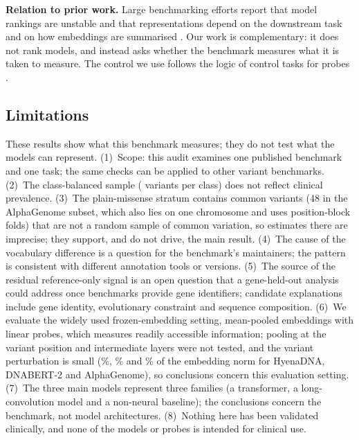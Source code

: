 \documentclass[11pt]{article}
\begin{document}
\textbf{Relation to prior work.} Large benchmarking efforts report that model rankings are unstable and that representations depend on the downstream task and on how embeddings are summarised \citep{feng2025benchmark,tang2025representational,ledneva2026geneb}. Our work is complementary: it does not rank models, and instead asks whether the benchmark measures what it is taken to measure. The control we use follows the logic of control tasks for probes \citep{hewitt2019control}.

\subsection*{Limitations}
These results show what this benchmark measures; they do not test what the models can represent. (1)~Scope: this audit examines one published benchmark and one task; the same checks can be applied to other variant benchmarks. (2)~The class-balanced sample (\NPerClass{} variants per class) does not reflect clinical prevalence. (3)~The plain-missense stratum contains \PureStratC{} common variants (48 in the AlphaGenome subset, which also lies on one chromosome and uses position-block folds) that are not a random sample of common variation, so estimates there are imprecise; they support, and do not drive, the main result. (4)~The cause of the vocabulary difference is a question for the benchmark's maintainers; the pattern is consistent with different annotation tools or versions. (5)~The source of the residual reference-only signal is an open question that a gene-held-out analysis could address once benchmarks provide gene identifiers; candidate explanations include gene identity, evolutionary constraint and sequence composition. (6)~We evaluate the widely used frozen-embedding setting, mean-pooled embeddings with linear probes, which measures readily accessible information; pooling at the variant position and intermediate layers were not tested, and the variant perturbation is small (\RelHyn\%, \RelDnb\% and \RelAg\% of the embedding norm for HyenaDNA, DNABERT-2 and AlphaGenome), so conclusions concern this evaluation setting. (7)~The three main models represent three families (a transformer, a long-convolution model and a non-neural baseline); the conclusions concern the benchmark, not model architectures. (8)~Nothing here has been validated clinically, and none of the models or probes is intended for clinical use.

\end{document}
